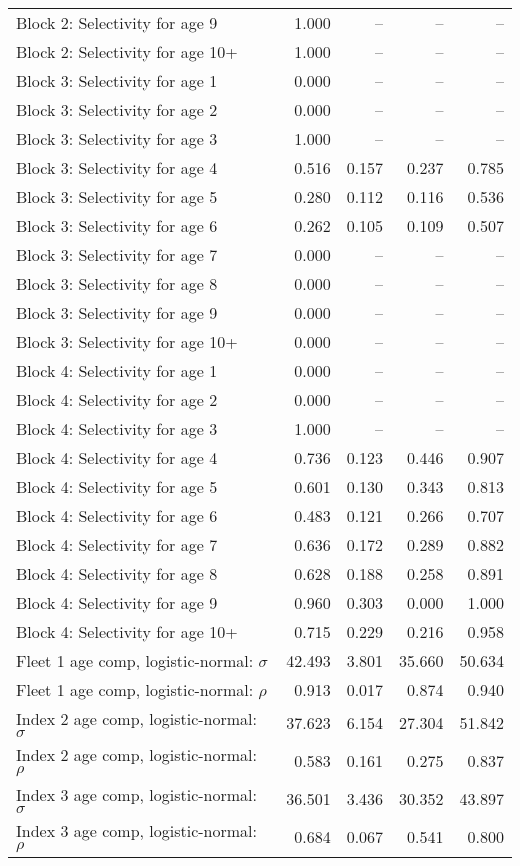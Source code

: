 \documentclass[
]{article}
\begin{document}
\begin{landscape}
\begin{longtable}[t]{lrrrr}
Block 2: Selectivity for age 9 & 1.000 & -- & -- & --\\
Block 2: Selectivity for age 10+ & 1.000 & -- & -- & --\\
Block 3: Selectivity for age 1 & 0.000 & -- & -- & --\\
Block 3: Selectivity for age 2 & 0.000 & -- & -- & --\\
\addlinespace
Block 3: Selectivity for age 3 & 1.000 & -- & -- & --\\
Block 3: Selectivity for age 4 & 0.516 & 0.157 & 0.237 & 0.785\\
Block 3: Selectivity for age 5 & 0.280 & 0.112 & 0.116 & 0.536\\
Block 3: Selectivity for age 6 & 0.262 & 0.105 & 0.109 & 0.507\\
Block 3: Selectivity for age 7 & 0.000 & -- & -- & --\\
\addlinespace
Block 3: Selectivity for age 8 & 0.000 & -- & -- & --\\
Block 3: Selectivity for age 9 & 0.000 & -- & -- & --\\
Block 3: Selectivity for age 10+ & 0.000 & -- & -- & --\\
Block 4: Selectivity for age 1 & 0.000 & -- & -- & --\\
Block 4: Selectivity for age 2 & 0.000 & -- & -- & --\\
\addlinespace
Block 4: Selectivity for age 3 & 1.000 & -- & -- & --\\
Block 4: Selectivity for age 4 & 0.736 & 0.123 & 0.446 & 0.907\\
Block 4: Selectivity for age 5 & 0.601 & 0.130 & 0.343 & 0.813\\
Block 4: Selectivity for age 6 & 0.483 & 0.121 & 0.266 & 0.707\\
Block 4: Selectivity for age 7 & 0.636 & 0.172 & 0.289 & 0.882\\
\addlinespace
Block 4: Selectivity for age 8 & 0.628 & 0.188 & 0.258 & 0.891\\
Block 4: Selectivity for age 9 & 0.960 & 0.303 & 0.000 & 1.000\\
Block 4: Selectivity for age 10+ & 0.715 & 0.229 & 0.216 & 0.958\\
Fleet 1 age comp, logistic-normal: $\sigma$ & 42.493 & 3.801 & 35.660 & 50.634\\
Fleet 1 age comp, logistic-normal: $\rho$ & 0.913 & 0.017 & 0.874 & 0.940\\
\addlinespace
Index 2 age comp, logistic-normal: $\sigma$ & 37.623 & 6.154 & 27.304 & 51.842\\
Index 2 age comp, logistic-normal: $\rho$ & 0.583 & 0.161 & 0.275 & 0.837\\
Index 3 age comp, logistic-normal: $\sigma$ & 36.501 & 3.436 & 30.352 & 43.897\\
Index 3 age comp, logistic-normal: $\rho$ & 0.684 & 0.067 & 0.541 & 0.800\\*
\end{longtable}
\end{landscape}
\end{document}
